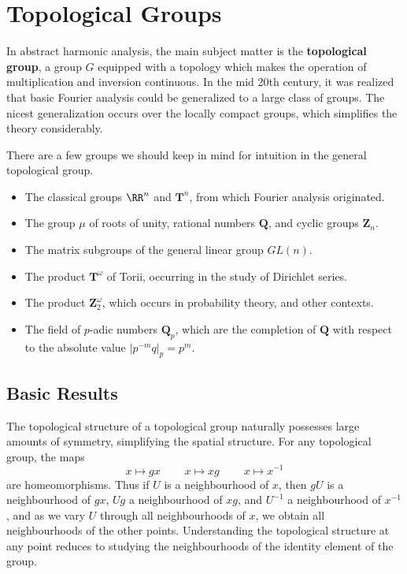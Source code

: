 \chapter{Topological Groups}

In abstract harmonic analysis, the main subject matter is the {\bf topological group}, a group $G$ equipped with a topology which makes the operation of multiplication and inversion continuous. In the mid 20th century, it was realized that basic Fourier analysis could be generalized to a large class of groups. The nicest generalization occurs over the locally compact groups, which simplifies the theory considerably.

\begin{example}
    There are a few groups we should keep in mind for intuition in the general topological group.
    \begin{itemize}
        \item The classical groups $\RR^n$ and $\mathbf{T}^n$, from which Fourier analysis originated.
        \item The group $\mu$ of roots of unity, rational numbers $\mathbf{Q}$, and cyclic groups $\mathbf{Z}_n$.
        \item The matrix subgroups of the general linear group $GL(n)$.
        \item The product $\mathbf{T}^\omega$ of Torii, occurring in the study of Dirichlet series.
        \item The product $\mathbf{Z}_2^\omega$, which occurs in probability theory, and other contexts.
        \item The field of $p$-adic numbers $\mathbf{Q}_p$, which are the completion of $\mathbf{Q}$ with respect to the absolute value $|p^{-m} q|_p = p^m$.
    \end{itemize}
\end{example}

\section{Basic Results}

The topological structure of a topological group naturally possesses large amounts of symmetry, simplifying the spatial structure. For any topological group, the maps
%
\[ x \mapsto gx\ \ \ \ \ \ \ \ \ \ x \mapsto xg\ \ \ \ \ \ \ \ \ \ x \mapsto x^{-1} \]
%
are homeomorphisms. Thus if $U$ is a neighbourhood of $x$, then $gU$ is a neighbourhood of $gx$, $Ug$ a neighbourhood of $xg$, and $U^{-1}$ a neighbourhood of $x^{-1}$, and as we vary $U$ through all neighbourhoods of $x$, we obtain all neighbourhoods of the other points. Understanding the topological structure at any point reduces to studying the neighbourhoods of the identity element of the group.

